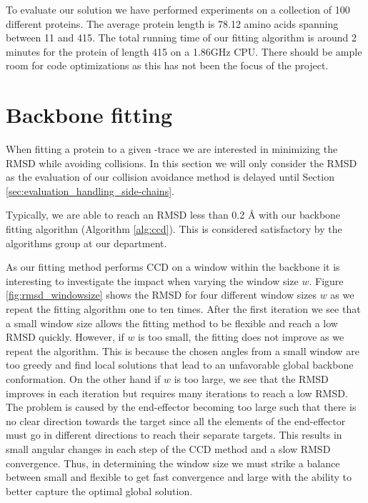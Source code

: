 To evaluate our solution we have performed experiments on a collection of 100 different proteins.
The average protein length is 78.12 amino acids spanning between 11 and 415.
The total running time of our fitting algorithm is around 2 minutes for the protein of length 415 on a 1.86GHz CPU.
There should be ample room for code optimizations as this has not been the focus of the project.

\section{Backbone fitting}
When fitting a protein to a given \Ca-trace we are interested in minimizing the RMSD while avoiding collisions.
In this section we will only consider the RMSD as the evaluation of our collision avoidance method  is delayed until Section \ref{sec:evaluation_handling_side-chains}. 

Typically, we are able to reach an RMSD less than 0.2 Å with our backbone fitting algorithm (Algorithm \ref{alg:ccd}).
This is considered satisfactory by the algorithms group at our department.

As our fitting method performs CCD on a window within the backbone it is interesting to investigate the impact when varying the window size $w$.
Figure \ref{fig:rmsd_windowsize} shows the RMSD for four different window sizes $w$ as we repeat the fitting algorithm one to ten times.
After the first iteration we see that a small window size allows the fitting method to be flexible and reach a low RMSD quickly.
However, if $w$ is too small, the fitting does not improve as we repeat the algorithm.
This is because the chosen angles from a small window are too greedy and find local solutions that lead to an unfavorable global backbone conformation.
On the other hand if $w$ is too large, we see that the RMSD improves in each iteration but requires many iterations to reach a low RMSD.
The problem is caused by the end-effector becoming too large such that there is no clear direction towards the target since all the elements of the end-effector must go in different directions to reach their separate targets.
This results in small angular changes in each step of the CCD method and a slow RMSD convergence.
Thus, in determining the window size we must strike a balance between small and flexible to get fast convergence and large with the ability to better capture the optimal global solution.

